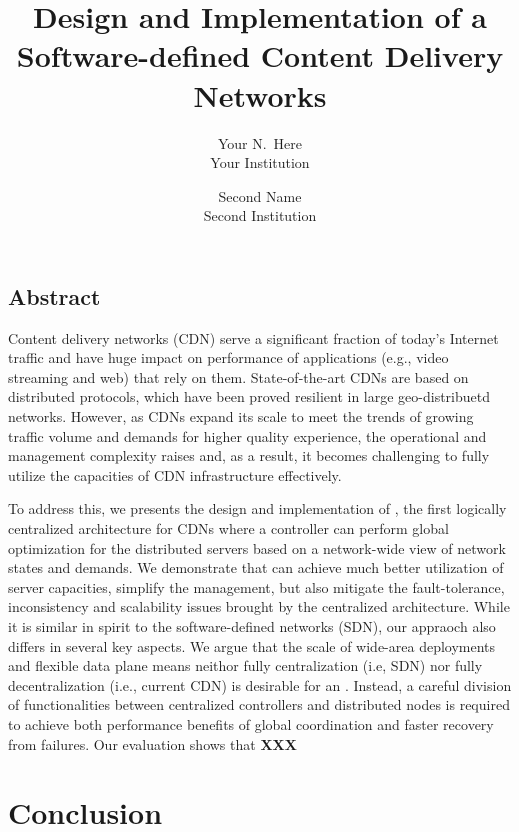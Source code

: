 \documentclass[letterpaper,twocolumn,10pt]{article}
\newcounter{note}[section]
\newcommand{\fillme}{{\bf XXX}~}
\begin{document}
\date{}

\title{Design and Implementation of a Software-defined Content Delivery Networks}

\author{
{\rm Your N.\ Here}\\
Your Institution
\and
{\rm Second Name}\\
Second Institution
} %

\maketitle

\thispagestyle{empty}


\subsection*{Abstract}
Content delivery networks (CDN) serve a significant fraction of today's Internet traffic and have huge impact on performance of applications (e.g., video streaming and web) that rely on them. 
State-of-the-art CDNs are based on distributed protocols, which have been proved resilient in large geo-distribuetd networks. However, as CDNs expand its scale to meet the trends of growing traffic volume and demands for higher quality experience, the operational and management complexity raises and, as a result, it becomes challenging to fully utilize the capacities of CDN infrastructure effectively.

To address this, we presents the design and implementation of \SDCDN, the first logically centralized architecture for CDNs where a controller can perform global optimization for the distributed servers based on a network-wide view of network states and demands. We demonstrate that \SDCDN can achieve much better utilization of server capacities, simplify the management, but also mitigate the fault-tolerance, inconsistency and scalability issues brought by the centralized architecture.
While it is similar in spirit to the software-defined networks (SDN), our appraoch also differs in several key aspects. We argue that the scale of wide-area deployments and flexible data plane means neithor fully centralization (i.e, SDN) nor fully decentralization (i.e., current CDN) is  desirable for an \SDCDN. Instead, a careful division of functionalities between centralized controllers and distributed nodes is required to achieve both performance benefits of global coordination and faster recovery from failures. Our evaluation shows that \fillme 














\section{Conclusion}

{\footnotesize 
}


\theendnotes
\end{document}
